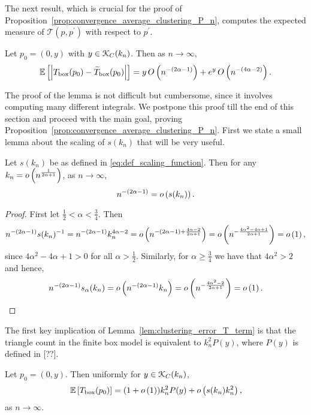  

The next result, which is crucial for the proof of Proposition~\ref{prop:convergence_average_clustering_P_n}, computes the expected measure of $\mathcal{T}(p,p^\prime)$ with respect to $p^\prime$. 

\begin{lemma}\label{lem:clustering_error_T_term}
Let $p_0 = (0,y)$ with $y \in {\mathcal K}_{C}(k_n)$. Then as $n \to \infty$,
\[
	\mathbb{E}\left[\left|T_{\text{box}}(p_0) - \widetilde{T}_{\text{box}}(p_0)\right|\right]
	= y \, O\left(n^{-(2\alpha - 1)}\right) + e^{y}\,O\left(n^{-(4\alpha-2)}\right).
\]
\end{lemma}

The proof of the lemma is not difficult but cumbersome, since it involves computing many different integrals. We postpone this proof till the end of this section and proceed with the main goal, proving Proposition~\ref{prop:convergence_average_clustering_P_n}. First we state a small lemma about the scaling of $s(k_n)$ that will be very useful.  

\begin{lemma}\label{lem:scaling_s_alpha}
Let $s(k_n)$ be as defined in \eqref{eq:def_scaling_function}. Then for any $k_n = o\left(n^{\frac{1}{2\alpha + 1}}\right)$, as $n \to \infty$,
\[
	n^{-(2\alpha - 1)} = o\left(s(k_n)\right).
\]
\end{lemma}

\begin{proof}
First let $\frac{1}{2} < \alpha < \frac{3}{4}$. Then
\[
	n^{-(2\alpha - 1)}s(k_n)^{-1} = n^{-(2\alpha -1)}k_n^{4\alpha - 2}
	= o\left(n^{-(2\alpha - 1) + \frac{4\alpha - 2}{2\alpha + 1}}\right) 
	= o\left(n^{-\frac{4\alpha^2 - 4\alpha + 1}{2\alpha + 1}}\right)
	= o\left(1\right),
\]
since $4\alpha^2 - 4\alpha + 1 > 0$ for all $\alpha > \frac{1}{2}$. Similarly, for $\alpha \ge \frac{3}{4}$ we have
that $4\alpha^2 > 2$ and hence,
\[
	n^{-(2\alpha - 1)} s_{\alpha}(k_n) = o\left(n^{-(2\alpha - 1)} k_n\right) = o\left(n^{-\frac{4\alpha^2 - 2}{2\alpha + 1}}\right)
	= o\left(1\right).
\]
\end{proof}

The first key implication of Lemma~\ref{lem:clustering_error_T_term} is that the triangle count in the finite box model is equivalent to $k_n^2 P(y)$, where $P(y)$ is defined in [??].

\begin{lemma}\label{lem:appox_triangle_count_box}
Let $p_0 = (0,y)$. Then uniformly for $y \in {\mathcal K}_C(k_n)$,
\[
	\mathbb{E}\left[T_{\mathrm{box}}(p_0)\right] = (1+o\left(1\right))k_n^2 P(y) + o\left(s(k_n) k_n^2\right),
\]
as $n \to \infty$.
\end{lemma}

